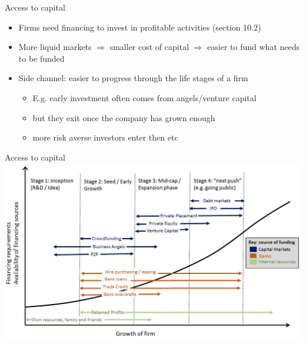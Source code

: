 \documentclass[english,10pt
,aspectratio=169
]{beamer}
\begin{document}
\begin{frame}{Access to capital}
	\begin{itemize}
		\item Firms need financing to invest in profitable activities (section 10.2)
		\item More liquid markets $\Rightarrow$ smaller cost of capital $\Rightarrow$ easier to fund what needs to be funded
		\item Side channel: easier to progress through the life stages of a firm
		\begin{itemize}
			\item E.g. early investment often comes from angels/venture capital
			\item but they exit once the company has grown enough
			\item more risk averse investors enter then etc
		\end{itemize}
	\end{itemize}
\end{frame}


\begin{frame}{Access to capital}
	\centering
	\includegraphics[width=.7\paperwidth]{pics/funding}
\end{frame}
\end{document}
